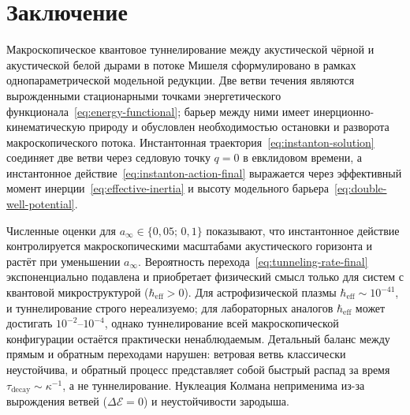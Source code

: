 \documentclass[12pt,a4paper,preprint]{elsarticle}
\begin{document}
    \section{Заключение}\label{sec:conclusions}
        Макроскопическое квантовое туннелирование между акустической чёрной и акустической белой дырами в потоке Мишеля сформулировано в рамках однопараметрической модельной редукции. Две ветви течения являются вырожденными стационарными точками энергетического функционала~\eqref{eq:energy-functional}; барьер между ними имеет инерционно-кинематическую природу и обусловлен необходимостью остановки и разворота макроскопического потока. Инстантонная траектория~\eqref{eq:instanton-solution} соединяет две ветви через седловую точку $q = 0$ в евклидовом времени, а инстантонное действие~\eqref{eq:instanton-action-final} выражается через эффективный момент инерции~\eqref{eq:effective-inertia} и высоту модельного барьера~\eqref{eq:double-well-potential}.
        
        Численные оценки для $a_{\infty} \in \{0{,}05;\, 0{,}1\}$ показывают, что инстантонное действие контролируется макроскопическими масштабами акустического горизонта и растёт при уменьшении $a_{\infty}$. Вероятность перехода~\eqref{eq:tunneling-rate-final} экспоненциально подавлена и приобретает физический смысл только для систем с квантовой микроструктурой ($\hbar_{\mathrm{eff}} > 0$). Для астрофизической плазмы $\hbar_{\mathrm{eff}} \sim 10^{-41}$, и туннелирование строго нереализуемо; для лабораторных аналогов $\hbar_{\mathrm{eff}}$ может достигать $10^{-2}$--$10^{-4}$, однако туннелирование всей макроскопической конфигурации остаётся практически ненаблюдаемым. Детальный баланс между прямым и обратным переходами нарушен: ветровая ветвь классически неустойчива, и обратный процесс представляет собой быстрый распад за время $\tau_{\mathrm{decay}} \sim \kappa^{-1}$, а не туннелирование. Нуклеация Колмана неприменима из-за вырождения ветвей ($\Delta\mathcal{E} = 0$) и неустойчивости зародыша.
        
\end{document}
